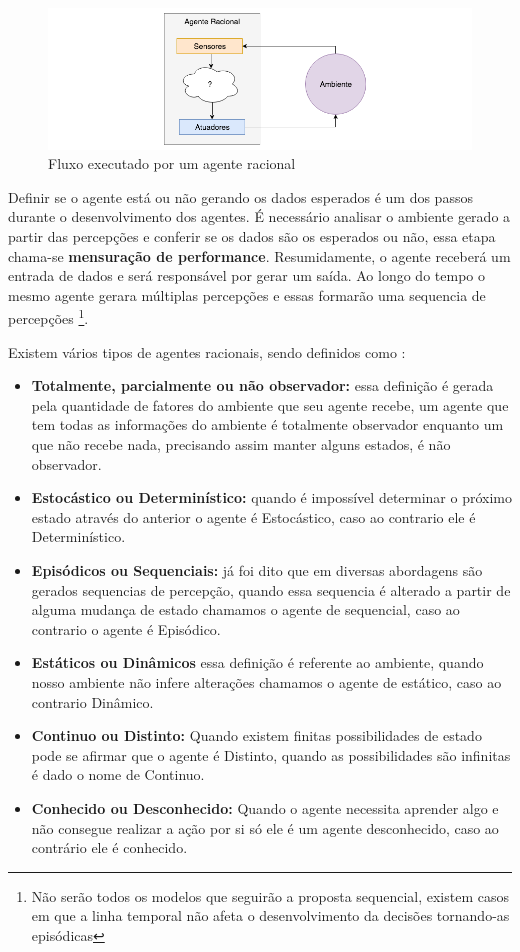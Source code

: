 \begin{figure}
    \centering
    \includegraphics[width=.8\textwidth]{imagens/rational_agent_draw.png}
    \caption{Fluxo executado por um agente racional}
    \label{fig:rational_agent_draw}
\end{figure}

Definir se o agente está ou não gerando os dados esperados é um dos passos durante o desenvolvimento dos agentes. É necessário analisar o ambiente gerado a partir das percepções e conferir se os dados são os esperados ou não, essa etapa chama-se \textbf{mensuração de performance}. Resumidamente, o agente receberá um entrada de dados e será responsável por gerar um saída. Ao longo do tempo o mesmo agente gerara múltiplas percepções e essas formarão uma sequencia de percepções \footnote{Não serão todos os modelos que seguirão a proposta sequencial, existem casos em que a linha temporal não afeta o desenvolvimento da decisões tornando-as episódicas}.

Existem vários tipos de agentes racionais, sendo definidos como \cite[34-45]{russell2003artificial}:

\begin{itemize}
 \item \textbf{Totalmente, parcialmente ou não observador:} essa definição é gerada pela quantidade de fatores do ambiente que seu agente recebe, um agente que tem todas as informações do ambiente é totalmente observador enquanto um que não recebe nada, precisando assim manter alguns estados, é não observador.
 \item \textbf{Estocástico ou Determinístico:} quando é impossível determinar o próximo estado através do anterior o agente é Estocástico, caso ao contrario ele é Determinístico.
 \item \textbf{Episódicos ou Sequenciais:} já foi dito que em diversas abordagens são gerados sequencias de percepção, quando essa sequencia é alterado a partir de alguma mudança de estado chamamos o agente de sequencial, caso ao contrario o agente é Episódico.
 \item \textbf{Estáticos ou Dinâmicos} essa definição é referente ao ambiente, quando nosso ambiente não infere alterações chamamos o agente de estático, caso ao contrario Dinâmico.
 \item \textbf{Continuo ou Distinto:} Quando existem finitas possibilidades de estado pode se afirmar que o agente é Distinto, quando as possibilidades são infinitas é dado o nome de Continuo.
 \item \textbf{Conhecido ou Desconhecido:} Quando o agente necessita aprender algo e não consegue realizar a ação por si só ele é um agente desconhecido, caso ao contrário ele é conhecido.
\end{itemize}

